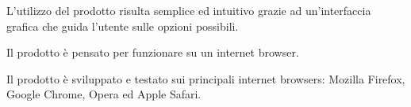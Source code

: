 
\begin{elenconumerato}{\subsubsecindent}
\item L'utilizzo del prodotto risulta semplice ed intuitivo grazie ad un'interfaccia grafica che guida l'utente sulle opzioni possibili.
\end{elenconumerato}

\begin{elenconumerato}{\subsubsecindent}
\item Il prodotto \`e pensato per funzionare su un internet browser.
\item Il prodotto \`e sviluppato e testato sui principali internet browsers: Mozilla Firefox, Google Chrome, Opera ed Apple Safari.
\end{elenconumerato}

